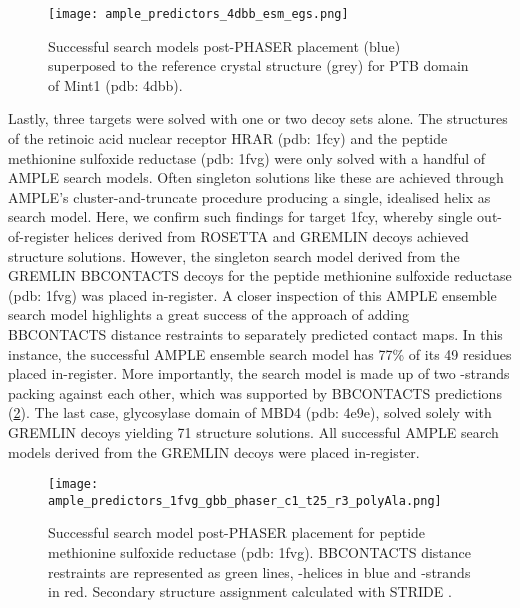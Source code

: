 \begin{figure}[H]
    \centering
    \texttt{[image: ample\_predictors\_4dbb\_esm\_egs.png]}
    \caption[Example of successfully placed AMPLE search model]{Successful search models post-PHASER placement (blue) superposed to the reference crystal structure (grey) for PTB domain of Mint1 (\gls{pdb}: 4dbb).}
    \label{fig:ample_predictors_4dbb_esm_egs}
\end{figure}

Lastly, three targets were solved with one or two decoy sets alone. The structures of the retinoic acid nuclear receptor HRAR (\gls{pdb}: 1fcy) and the peptide methionine sulfoxide reductase (\gls{pdb}: 1fvg) were only solved with a handful of AMPLE search models. Often singleton solutions like these are achieved through AMPLE’s cluster-and-truncate procedure producing a single, idealised helix as search model. Here, we confirm such findings for target 1fcy, whereby single out-of-register helices derived from ROSETTA and GREMLIN decoys achieved structure solutions. However, the singleton search model derived from the GREMLIN BBCONTACTS decoys for the peptide methionine sulfoxide reductase (\gls{pdb}: 1fvg) was placed in-register. A closer inspection of this AMPLE ensemble search model highlights a great success of the approach of adding BBCONTACTS distance restraints to separately predicted contact maps. In this instance, the successful AMPLE ensemble search model has 77\% of its 49 residues placed in-register. More importantly, the search model is made up of two \textbeta-strands packing against each other, which was supported by BBCONTACTS predictions (\cref{fig:ample_predictors_1fvg_gbb_phaser_c1_t25_r3_polyAla}). The last case, glycosylase domain of MBD4 (\gls{pdb}: 4e9e), solved solely with GREMLIN decoys yielding 71 structure solutions. All successful AMPLE search models derived from the GREMLIN decoys were placed in-register.

\begin{figure}[H]
    \centering
    \texttt{[image: ample\_predictors\_1fvg\_gbb\_phaser\_c1\_t25\_r3\_polyAla.png]}
    \caption[Example of successfully placed AMPLE search model]{Successful search model post-PHASER placement for peptide methionine sulfoxide reductase (\gls{pdb}: 1fvg). BBCONTACTS distance restraints are represented as green lines, \textalpha-helices in blue and \textbeta-strands in red. Secondary structure assignment calculated with STRIDE \cite{Frishman1995-si}.}
    \label{fig:ample_predictors_1fvg_gbb_phaser_c1_t25_r3_polyAla}
\end{figure}

